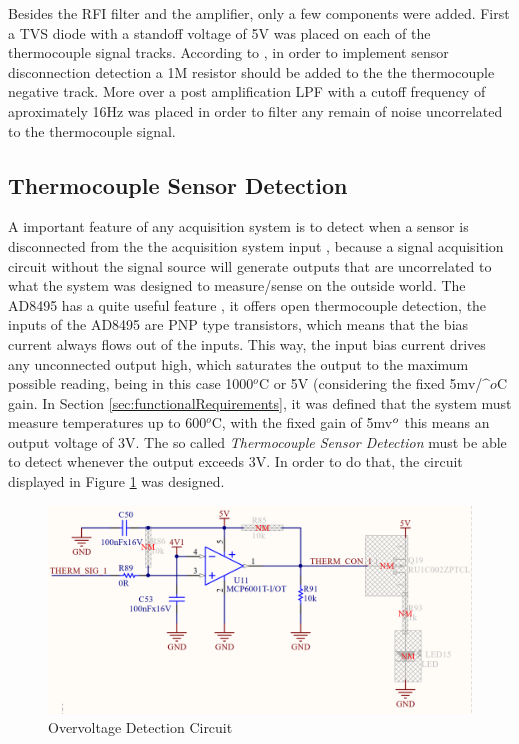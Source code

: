 	Besides the RFI filter and the amplifier, only a few components were added. First a TVS diode with a standoff voltage of 5V was placed on each of the thermocouple signal tracks. According to \cite{ad8495-datasheet}, in order to implement sensor disconnection detection a 1M resistor should be added to the the thermocouple negative track. More over a post amplification LPF with a cutoff frequency of aproximately 16Hz was placed in order to filter any remain of noise uncorrelated to the thermocouple signal.
		
	\subsection{Thermocouple Sensor Detection}\label{ssec:thermocouple-sensor-detection}
		
	A important feature of any acquisition system is to detect when a sensor is disconnected from the the acquisition system input \cite{o2011pressure}, because a signal acquisition circuit without the signal source will generate outputs that are uncorrelated to what the system was designed to measure/sense on the outside world. The AD8495 has a quite useful feature \cite{ad8495-datasheet}, it offers open thermocouple detection, the inputs of the AD8495 are PNP type transistors, which means that the bias current always flows out of the inputs. This way, the input bias current drives any unconnected output high, which saturates the output to the maximum possible reading, being in this case 1000$^{o}$C or 5V (considering the fixed 5mv/$\^{o}$C gain. In Section \ref{sec:functionalRequirements}, it was defined that the system must measure temperatures up to 600$^{o}$C, with the fixed gain of 5mv$\/^{o}$ this means an output voltage of 3V. The so called \textit{Thermocouple Sensor Detection} must be able to detect whenever the output exceeds 3V. In order to do that, the circuit displayed in Figure \ref{fig:overvoltage-sensor-detection} was designed.
	
		\begin{figure}[htbp]
			\centering
				\includegraphics[width=.8\textwidth]{figuras/fig-overvoltage-sensor-detection}
			\caption{Overvoltage Detection Circuit}
			\label{fig:overvoltage-sensor-detection}
		\end{figure}
		
